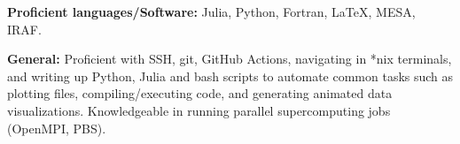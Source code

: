 
\begin{cventries}
\raggedright{
\textbf{Proficient languages/Software:} Julia, Python, Fortran, \LaTeX, MESA, IRAF.

     \textbf{General:} Proficient with SSH, git, GitHub Actions, navigating in *nix terminals,
     and writing up Python, Julia and bash scripts to automate common tasks such as
     plotting files, compiling/executing code, and generating animated data visualizations.
     Knowledgeable in running parallel supercomputing
     jobs (OpenMPI, PBS).
}
\end{cventries}